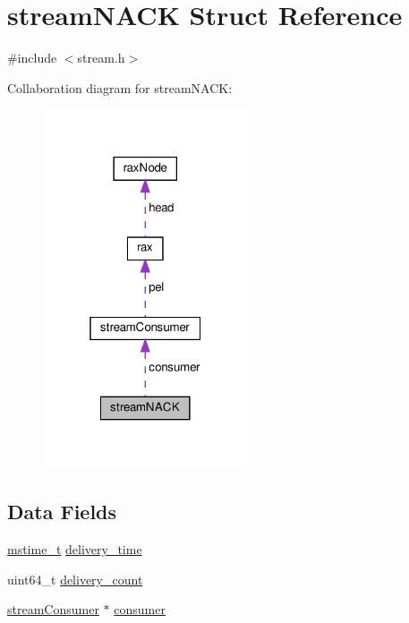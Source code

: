 \hypertarget{structstream_n_a_c_k}{}\section{stream\+N\+A\+CK Struct Reference}
\label{structstream_n_a_c_k}


{\ttfamily \#include $<$stream.\+h$>$}



Collaboration diagram for stream\+N\+A\+CK\+:
\nopagebreak
\begin{figure}[H]
\begin{center}
\leavevmode
\includegraphics[width=172pt]{structstream_n_a_c_k__coll__graph}
\end{center}
\end{figure}
\subsection*{Data Fields}
\begin{DoxyCompactItemize}
\item 
\hyperlink{redismodule_8h_a652ae61e2475bc8957454534544968fc}{mstime\+\_\+t} \hyperlink{structstream_n_a_c_k_a6586ab12c1a0abb25d054f734432219c}{delivery\+\_\+time}
\item 
uint64\+\_\+t \hyperlink{structstream_n_a_c_k_a2e86aa619e8c88bc0005fb19d644747e}{delivery\+\_\+count}
\item 
\hyperlink{structstream_consumer}{stream\+Consumer} $\ast$ \hyperlink{structstream_n_a_c_k_a1e3d14baba703bfa5373c96013e3a9b4}{consumer}
\end{DoxyCompactItemize}


